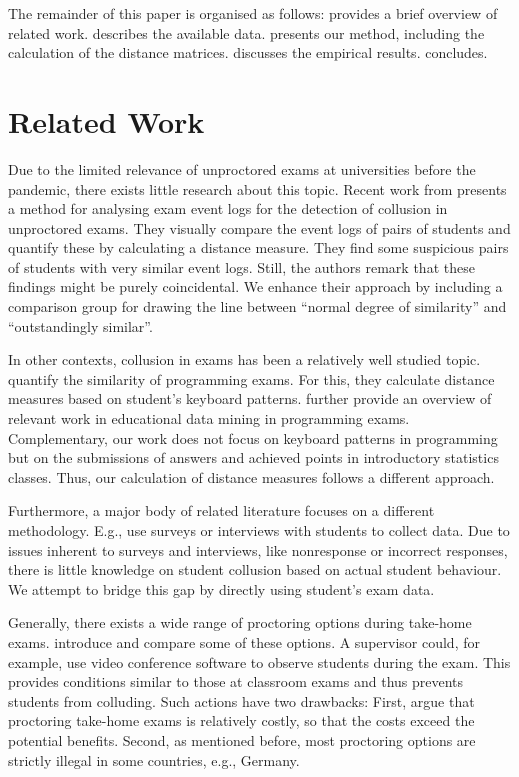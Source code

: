 \documentclass{edm_article}
\begin{document}
The remainder of this paper is organised as follows:  provides a brief overview of related work.  describes the available data.  presents our method, including the calculation of the distance matrices.  discusses the empirical results.  concludes.

\section{Related Work}\label{sec:related}

Due to the limited relevance of unproctored exams at universities before the pandemic, there exists little research about this topic. Recent work from \cite{cleophas2021s} presents a method for analysing exam event logs for the detection of collusion in unproctored exams. They visually compare the event logs of pairs of students and quantify these by calculating a distance measure. They find some suspicious pairs of students with very similar event logs. Still, the authors remark that these findings might be purely coincidental. We enhance their approach by including a comparison group for drawing the line between ``normal degree of similarity'' and ``outstandingly similar''.

In other contexts, collusion in exams has been a relatively well studied topic. \cite{Hellas_2017,Leinonen_2016} quantify the similarity of programming exams. For this, they calculate distance measures based on student's keyboard patterns. \cite{ihantola_2015} further provide an overview of relevant work in educational data mining in programming exams. Complementary, our work does not focus on keyboard patterns in programming but on the submissions of answers and achieved points in introductory statistics classes. Thus, our calculation of distance measures follows a different approach. 

Furthermore, a major body of related literature focuses on a different methodology. E.g., \cite{bowers,hemming2010online,mccabe2001cheating,olt2002ethics,shon2006college} use surveys or interviews with students to collect data. Due to issues inherent to surveys and interviews, like nonresponse or incorrect responses, there is little knowledge on student collusion based on actual student behaviour. We attempt to bridge this gap by directly using student's exam data. 

Generally, there exists a wide range of proctoring options during take-home exams. \cite{goldberg2021programming, hussein2020evaluation} introduce and compare some of these options. A supervisor could, for example, use video conference software to observe students during the exam. This provides conditions similar to those at classroom exams and thus prevents students from colluding. Such actions have two drawbacks: First, \cite{cluskey2011thwarting} argue that proctoring take-home exams is relatively costly, so that the costs exceed the potential benefits. Second, as mentioned before, most proctoring options are strictly illegal in some countries, e.g., Germany. 
\end{document}
